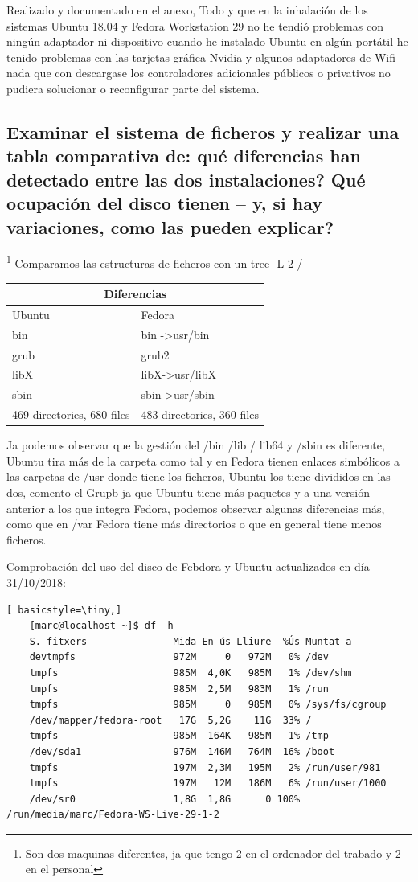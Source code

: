 \documentclass[preprint,11pt]{elsarticle}
\begin{document}
Realizado y documentado en el anexo, Todo y que en la inhalación de los sistemas Ubuntu 18.04 y Fedora Workstation 29 no he tendió problemas con ningún adaptador ni dispositivo cuando he instalado Ubuntu en algún portátil he tenido problemas con las tarjetas gráfica Nvidia y algunos adaptadores de Wifi nada que con descargase los controladores adicionales públicos o privativos no pudiera solucionar o reconfigurar parte del sistema.

\subsection{Examinar el sistema de ficheros y realizar una tabla comparativa de: qué diferencias han detectado entre las dos instalaciones? Qué ocupación del disco tienen – y, si hay variaciones, como las pueden explicar?} 
\footnote{Son dos maquinas diferentes, ja que tengo 2 en el ordenador del trabado y 2 en el personal} Comparamos las estructuras de ficheros con un tree -L 2 / 

\begin{tabular}{ |p{7cm}||p{7cm}| }
    \hline
    \multicolumn{2}{|c|}{Diferencias} \\
    \hline
    Ubuntu& Fedora\\
    \hline
   	bin   & bin -\textgreater  usr/bin   \\
    grub &   grub2 \\
    libX & libX-\textgreater usr/libX\\
    sbin & sbin-\textgreater usr/sbin\\
    469 directories, 680 files & 	483 directories, 360 files \\
    \hline
\end{tabular}

Ja podemos observar que la gestión del /bin /lib / lib64 y /sbin es diferente, Ubuntu tira más de la carpeta como tal y en Fedora tienen enlaces simbólicos a las carpetas de /usr donde tiene los ficheros, Ubuntu los tiene divididos en las dos, comento el Grupb ja que Ubuntu tiene más paquetes y a una versión anterior a los que integra Fedora, podemos observar algunas diferencias más, como que en /var Fedora tiene más directorios o que en general tiene menos ficheros. \bigskip

Comprobación del uso del disco de Febdora y Ubuntu actualizados en día 31/10/2018:
\begin{lstlisting}[ basicstyle=\tiny,]
    [marc@localhost ~]$ df -h
    S. fitxers               Mida En ús Lliure  %Ús Muntat a
    devtmpfs                 972M     0   972M   0% /dev
    tmpfs                    985M  4,0K   985M   1% /dev/shm
    tmpfs                    985M  2,5M   983M   1% /run
    tmpfs                    985M     0   985M   0% /sys/fs/cgroup
    /dev/mapper/fedora-root   17G  5,2G    11G  33% /
    tmpfs                    985M  164K   985M   1% /tmp
    /dev/sda1                976M  146M   764M  16% /boot
    tmpfs                    197M  2,3M   195M   2% /run/user/981
    tmpfs                    197M   12M   186M   6% /run/user/1000
    /dev/sr0                 1,8G  1,8G      0 100% /run/media/marc/Fedora-WS-Live-29-1-2

\end{lstlisting}
\end{document}
